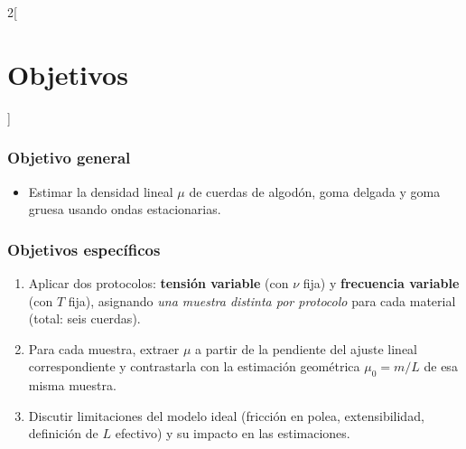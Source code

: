 \begin{multicols}{2}[\section*{Objetivos}]
\subsubsection*{Objetivo general}
\begin{itemize}[leftmargin=*, itemsep=2pt]
  \item Estimar la densidad lineal $\mu$ de cuerdas de algodón, goma delgada y goma gruesa usando ondas estacionarias.
\end{itemize}

\subsubsection*{Objetivos específicos}
\begin{enumerate}[leftmargin=*, itemsep=2pt, label=\textbf{\arabic*.}]
  \item Aplicar dos protocolos: \textbf{tensión variable} (con $\nu$ fija) y \textbf{frecuencia variable} (con $T$ fija), asignando \emph{una muestra distinta por protocolo} para cada material (total: seis cuerdas).
  \item Para cada muestra, extraer $\mu$ a partir de la pendiente del ajuste lineal correspondiente y contrastarla con la estimación geométrica $\mu_{0}=m/L$ de esa misma muestra.
  \item Discutir limitaciones del modelo ideal (fricción en polea, extensibilidad, definición de $L$ efectivo) y su impacto en las estimaciones.
\end{enumerate}
\end{multicols}


